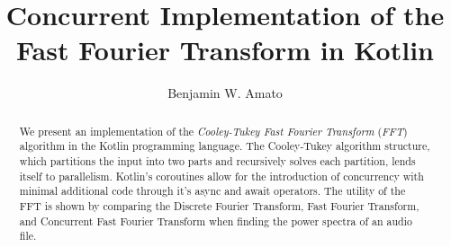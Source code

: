 \documentclass[sigconf]{acmart}
\begin{document}
\title{Concurrent Implementation of the \\ Fast Fourier Transform in Kotlin}

\author{Benjamin W. Amato}

\begin{abstract}
We present an implementation of the \textit{Cooley-Tukey Fast Fourier Transform} (\textit{FFT}) algorithm in the Kotlin programming language. The Cooley-Tukey algorithm structure, which partitions the input into two parts and recursively solves each partition, lends itself to parallelism. Kotlin's coroutines allow for the introduction of concurrency with minimal additional code through it's async and await operators. The utility of the FFT is shown by comparing the Discrete Fourier Transform, Fast Fourier Transform, and Concurrent Fast Fourier Transform when finding the power spectra of an audio file.
\end{abstract}
\maketitle
\end{document}
